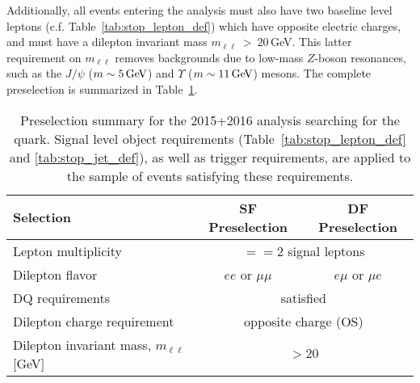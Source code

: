 Additionally, all events entering the analysis must also have two baseline level leptons (c.f. Table~\ref{tab:stop_lepton_def})
which have opposite electric charges, and must have a dilepton invariant mass $m_{\ell \ell}~>~20$\,GeV.
This latter requirement on $m_{\ell\ell}$ removes backgrounds due to low-mass $Z$-boson resonances, such as the $J/\psi$ ($m \sim 5\,\text{Ge\kern -0.1em V}$)
and $\Upsilon$ ($m \sim 11\,\text{Ge\kern -0.1em V}$) mesons. The complete preselection is summarized in Table~\ref{tab:stop_preselection}.

\begin{table}[!htb]
    \begin{center}
        \caption{
            Preselection summary for the 2015+2016 analysis searching for the \stopone quark.
            Signal level object requirements (Table~\ref{tab:stop_lepton_def} and \ref{tab:stop_jet_def}), as well as trigger requirements,
            are applied to the sample of events satisfying these requirements.
        }
        \label{tab:stop_preselection}
        \begin{tabular}{l|c| c}
            \hline
            \hline
            \textbf{Selection} & \textbf{SF Preselection} & \textbf{DF Preselection} \\
            \hline
            Lepton multiplicity & \multicolumn{2}{c}{$==2$ signal leptons} \\
            Dilepton flavor & $ee$ or $\mu \mu$ & $e\mu$ or $\mu e$ \\
            DQ requirements & \multicolumn{2}{c}{satisfied} \\
            Dilepton charge requirement & \multicolumn{2}{c}{opposite charge (OS)} \\
            Dilepton invariant mass, $m_{\ell\ell}$ [GeV] & \multicolumn{2}{c}{$>20$} \\
            \hline
            \hline
        \end{tabular}
    \end{center}
\end{table}
